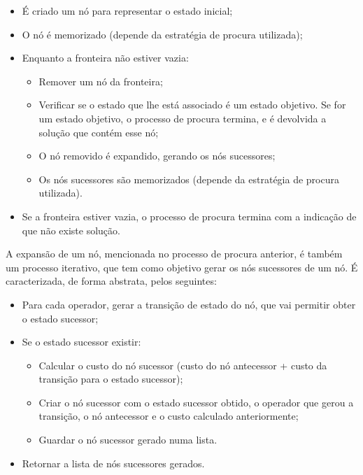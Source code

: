 \begin{itemize}
    \item É criado um nó para representar o estado inicial;
    \item O nó é memorizado (depende da estratégia de procura utilizada);
    \item Enquanto a fronteira não estiver vazia:
    \begin{itemize}
        \item Remover um nó da fronteira;
        \item Verificar se o estado que lhe está associado é um estado objetivo.
        Se for um estado objetivo, o processo de procura termina, e é devolvida a solução que contém esse nó;
        \item O nó removido é expandido, gerando os nós sucessores;
        \item Os nós sucessores são memorizados (depende da estratégia de procura utilizada).
    \end{itemize}
    \item Se a fronteira estiver vazia, o processo de procura termina com a indicação de que não existe solução.
\end{itemize}

A expansão de um nó, mencionada no processo de procura anterior, é também um processo iterativo, que tem como objetivo gerar os nós sucessores de um nó.
É caracterizada, de forma abstrata, pelos seguintes:

\begin{itemize}
    \item Para cada operador, gerar a transição de estado do nó, que vai permitir obter o estado sucessor;
    \item Se o estado sucessor existir:
    \begin{itemize}
        \item Calcular o custo do nó sucessor (custo do nó antecessor + custo da transição para o estado sucessor);
        \item Criar o nó sucessor com o estado sucessor obtido, o operador que gerou a transição, o nó antecessor e o custo calculado anteriormente;
        \item Guardar o nó sucessor gerado numa lista.
    \end{itemize}
    \item Retornar a lista de nós sucessores gerados.
\end{itemize}

